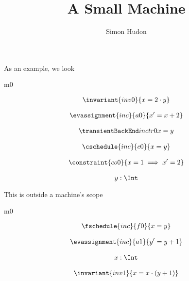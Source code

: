 \documentclass[12pt]{amsart}
\title{A Small Machine}
\author{Simon Hudon}
\date{} %
\begin{document}
\maketitle

As an example, we look

\begin{machine}{m0}


\begin{align*}
\invariant{inv0}
{	x = 2 \cdot y	}
\end{align*}

\begin{align*}
\evassignment{inc}{a0}
{	x' = x + 2	}
\end{align*}

\begin{align*}
\transient{inc}{tr0}
{	x = y	}
\end{align*}

\begin{align*}
\cschedule{inc}{c0}
{	x = y	}
\end{align*}

\begin{align*}
\constraint{co0}
{	x = 1 \implies x' = 2	}
\end{align*}

\begin{align*}
\variable{	y: \Int}
\end{align*}

\end{machine}
This is outside a machine's scope

\begin{machine}{m0}

\begin{align*}
\fschedule{inc}{f0}
{	x = y	}
\end{align*}

\begin{align*}
\evassignment{inc}{a1}
{	y' = y + 1	}
\end{align*}

\begin{align*}
\variable{	x: \Int}
\end{align*}

\begin{align*}
\invariant{inv1}
{	x = x \cdot (y + 1)	}
\end{align*}


\end{machine}
\end{document}
